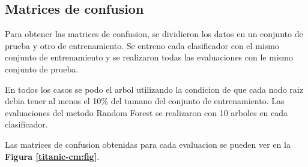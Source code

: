 \documentclass[a4paper]{article}
\newcommand{\reffig}[1]{\textbf{Figura \ref{#1}}}
\begin{document}
  \subsection{Matrices de confusion}
  Para obtener las matrices de confusion, se dividieron los datos en un conjunto de prueba y otro de entrenamiento. Se entreno cada clasificador con el mismo conjunto de entrenamiento y se realizaron todas las evaluaciones con le mismo conjunto de prueba.
  
  En todos los casos se podo el arbol utilizando la condicion de que cada nodo raiz debia tener al menos el 10\% del tamano del conjunto de entrenamiento. Las evaluaciones del metodo Random Forest se realizaron con 10 arboles en cada clasificador.

  Las matrices de confusion obtenidas para cada evaluacion se pueden ver en la \reffig{titanic-cm:fig}.
\end{document}
